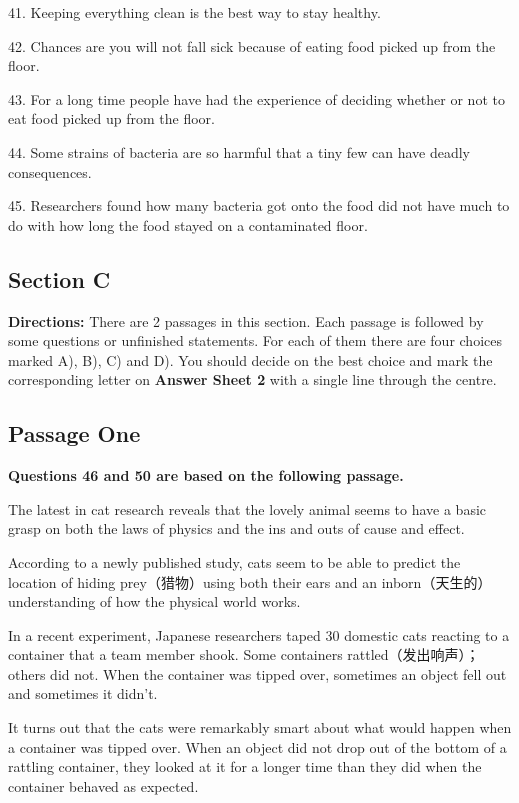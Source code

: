 \documentclass[UTF8,11pt]{ctexart}
\begin{document}
41. Keeping everything clean is the best way to stay healthy.


42. Chances are you will not fall sick because of eating food picked up from the floor.


43. For a long time people have had the experience of deciding whether or not to eat food picked up from the floor.


44. Some strains of bacteria are so harmful that a tiny few can have deadly consequences.


45. Researchers found how many bacteria got onto the food did not have much to do with how long the food stayed on a contaminated floor.


\subsection*{\textbf{Section C}}


\textbf{Directions:} There are 2 passages in this section. Each passage is followed by some questions or unfinished statements. For each of them there are four choices marked A), B), C) and D). You should decide on the best choice and mark the corresponding letter on\textbf{ Answer Sheet 2} with a single line through the centre.


\subsection*{\textbf{Passage One}}


\textbf{Questions 46 and 50 are based on the following passage.}


The latest in cat research reveals that the lovely animal seems to have a basic grasp on both the laws of physics and the ins and outs of cause and effect.


According to a newly published study, cats seem to be able to predict the location of hiding prey（猎物）using both their ears and an inborn（天生的）understanding of how the physical world works.


In a recent experiment, Japanese researchers taped 30 domestic cats reacting to a container that a team member shook. Some containers rattled（发出响声）；others did not. When the container was tipped over, sometimes an object fell out and sometimes it didn’t.


It turns out that the cats were remarkably smart about what would happen when a container was tipped over. When an object did not drop out of the bottom of a rattling container, they looked at it for a longer time than they did when the container behaved as expected.
\end{document}
